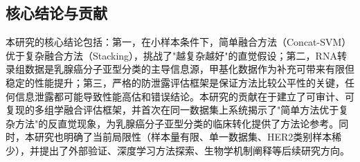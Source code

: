 \subsection{核心结论与贡献}

本研究的核心结论包括：第一，在小样本条件下，简单融合方法（Concat-SVM）优于复杂融合方法（Stacking），挑战了"越复杂越好"的直觉假设；第二，RNA转录组数据是乳腺癌分子亚型分类的主导信息源，甲基化数据作为补充可带来有限但稳定的性能提升；第三，严格的防泄露评估框架是保证方法比较公平性的关键，任何信息泄露都可能导致性能高估和错误结论。本研究的贡献在于建立了可审计、可复现的多组学融合评估框架，并首次在同一数据集上系统揭示了"简单方法优于复杂方法"的反直觉现象，为乳腺癌分子亚型分类的临床转化提供了方法论参考。同时，本研究也明确了当前局限性（样本量有限、单一数据集、HER2类别样本稀少），并提出了外部验证、深度学习方法探索、生物学机制阐释等后续研究方向。

